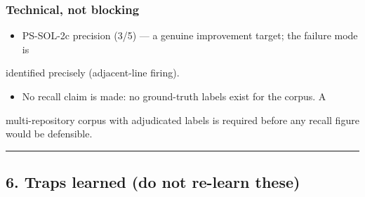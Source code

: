 \documentclass[10pt,a4paper]{article}
\begin{document}
\subsubsection*{Technical, not blocking}

\begin{itemize}
\item PS-SOL-2c precision (3/5) --- a genuine improvement target; the failure mode is
\end{itemize}
  identified precisely (adjacent-line firing).
\begin{itemize}
\item No recall claim is made: no ground-truth labels exist for the corpus. A
\end{itemize}
  multi-repository corpus with adjudicated labels is required before any recall
  figure would be defensible.

\vspace{3pt}\hrule\vspace{5pt}

\subsection*{6. Traps learned (do not re-learn these)}
\end{document}
